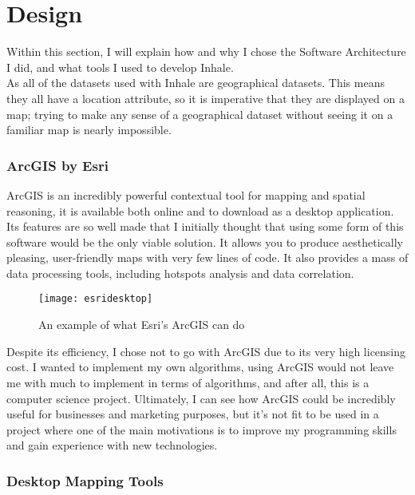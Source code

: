 \chapter{Design}
Within this section, I will explain how and why I chose the Software Architecture I did, and what tools I used to develop Inhale.\\

As all of the datasets used with Inhale are geographical datasets. This means they all have a location attribute, so it is imperative that they are displayed on a map; trying to make any sense of a geographical dataset without seeing it on a familiar map is nearly impossible.\\

\subsection{ArcGIS by Esri}

ArcGIS is an incredibly powerful contextual tool for mapping and spatial reasoning, it is available both online and to download as a desktop application. Its features are so well made that I initially thought that using some form of this software would be the only viable solution. It allows you to produce aesthetically pleasing, user-friendly maps with very few lines of code. It  also provides a mass of data processing tools, including hotspots analysis and data correlation.\\

\begin{figure}[H]
\begin{center}
\texttt{[image: esridesktop]}
\label{fig:esri}
\caption{An example of what Esri's ArcGIS can do \cite{esridesktop}}
\end{center}
\end{figure}

Despite its efficiency, I chose not to go with ArcGIS due to its very high licensing cost. I wanted to implement my own algorithms, using ArcGIS would not leave me with much to implement in terms of algorithms, and after all, this is a computer science project. Ultimately, I can see how ArcGIS could be incredibly useful for businesses and marketing purposes, but it's not fit to be used in a project where one of the main motivations is to improve my programming skills and gain experience with new technologies.\\

\subsection{Desktop Mapping Tools}

